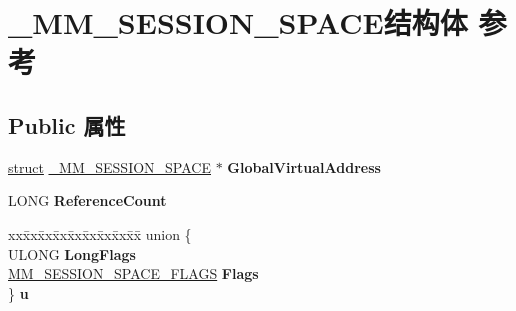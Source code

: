 \hypertarget{struct___m_m___s_e_s_s_i_o_n___s_p_a_c_e}{}\section{\+\_\+\+M\+M\+\_\+\+S\+E\+S\+S\+I\+O\+N\+\_\+\+S\+P\+A\+C\+E结构体 参考}
\label{struct___m_m___s_e_s_s_i_o_n___s_p_a_c_e}
\subsection*{Public 属性}
\begin{DoxyCompactItemize}
\item 
\mbox{\label{struct___m_m___s_e_s_s_i_o_n___s_p_a_c_e_a3e300351c5f17711daa7ad1cc3c1159a}} 
\hyperlink{interfacestruct}{struct} \hyperlink{struct___m_m___s_e_s_s_i_o_n___s_p_a_c_e}{\+\_\+\+M\+M\+\_\+\+S\+E\+S\+S\+I\+O\+N\+\_\+\+S\+P\+A\+CE} $\ast$ {\bfseries Global\+Virtual\+Address}
\item 
\mbox{\label{struct___m_m___s_e_s_s_i_o_n___s_p_a_c_e_ad276b532164b2974a466311e475701a1}} 
L\+O\+NG {\bfseries Reference\+Count}
\item 
\mbox{\label{struct___m_m___s_e_s_s_i_o_n___s_p_a_c_e_a6e681725887533670a657b7e606bac85}} 
\begin{tabbing}
xx\=xx\=xx\=xx\=xx\=xx\=xx\=xx\=xx\=\kill
union \{\\
\>ULONG {\bfseries LongFlags}\\
\>\hyperlink{struct___m_m___s_e_s_s_i_o_n___s_p_a_c_e___f_l_a_g_s}{MM\_SESSION\_SPACE\_FLAGS} {\bfseries Flags}\\
\} {\bfseries u}\\


\end{tabbing}
\end{DoxyCompactItemize}
